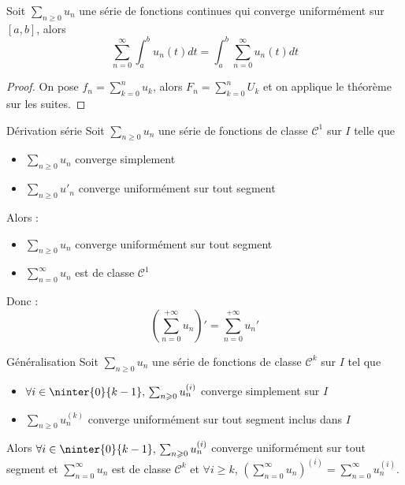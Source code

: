 \begin{corollaire}{}{}
    Soit $\sum_{n \geqslant 0} u_n$ une série de fonctions continues qui converge uniformément sur 
    $[a, b]$, alors 
    $$\sum_{n = 0}^{\infty} \int_{a}^{b} u_n(t) dt = \int_{a}^{b} \sum_{n = 0}^{\infty} u_n(t) dt$$
\end{corollaire}

\begin{proof}
    On pose $\displaystyle f_n = \sum_{k = 0}^n u_k$, alors $\displaystyle F_n = \sum_{k = 0 }^{n } U_k$ et on applique le 
    théorème sur les suites. 
\end{proof}

\begin{theoreme}{Dérivation série}{}
    Soit $\sum_{n \geqslant 0} u_n$ une série de fonctions de classe $\mathscr{C}^1$ sur $I$ telle que
    \begin{itemize}
        \item $\sum_{n \geqslant 0} u_n$ converge simplement
        \item $\sum_{n \geqslant 0} u'_n$ converge uniformément sur tout segment
    \end{itemize}
    Alors : 
    \begin{itemize}
        \item $\sum_{n \geqslant 0} u_n$ converge uniformément sur tout segment
        \item $\displaystyle \sum_{n = 0 }^{\infty } u_n$ est de classe $\mathscr C^1$
    \end{itemize}
    Donc : 
    $$\left(\sum_{n = 0}^{+ \infty} u_n\right)' = \sum_{n = 0 }^{+ \infty } u_n'$$
\end{theoreme}

\begin{theoreme}{Généralisation}{}
    Soit $\sum_{n \geqslant 0} u_n$ une série de fonctions de classe $\mathscr{C}^k$ sur $I$ tel que 
    \begin{itemize}
        \item $\forall i \in \ninter{0}{k - 1}, \, \sum_{n \geqslant 0} u_n^{(i)}$ converge simplement sur $I$ 
        \item $\sum_{n \geqslant 0} u_n^{(k)}$ converge uniformément sur tout segment inclus dans $I$   
    \end{itemize}

    Alors $\forall i \in \ninter{0}{k - 1}, \, \sum_{n \geqslant 0} u_n^{(i)}$ converge uniformément sur tout segment
    et $\displaystyle \sum_{n = 0}^{\infty} u_n$ est de classe $\mathscr{C}^k$ et 
    $\forall i \geqslant k$, $\displaystyle \left( \sum_{n = 0}^{\infty} u_n \right)^{(i)} = \sum_{n = 0}^{\infty} u_n^{(i)}$.
\end{theoreme}

